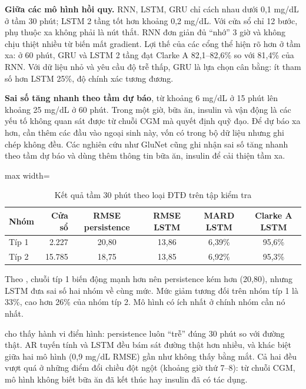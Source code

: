 \textbf{Giữa các mô hình hồi quy.} RNN, LSTM, GRU chỉ cách nhau dưới 0,1 mg/dL ở tầm 30 phút; LSTM 2 tầng tốt hơn khoảng 0,2 mg/dL. Với cửa sổ chỉ 12 bước, phụ thuộc xa không phải là nút thắt. RNN đơn giản đủ ``nhớ'' 3 giờ và không chịu thiệt nhiều từ biến mất gradient. Lợi thế của các cổng thể hiện rõ hơn ở tầm xa: ở 60 phút, GRU và LSTM 2 tầng đạt Clarke A 82,1–82,6\% so với 81,4\% của RNN. Với dữ liệu nhỏ và yêu cầu độ trễ thấp, GRU là lựa chọn cân bằng: ít tham số hơn LSTM 25\%, độ chính xác tương đương.

\textbf{Sai số tăng nhanh theo tầm dự báo}, từ khoảng 6 mg/dL ở 15 phút lên khoảng 25 mg/dL ở 60 phút. Trong một giờ, bữa ăn, insulin và vận động là các yếu tố không quan sát được từ chuỗi CGM mà quyết định quỹ đạo. Để dự báo xa hơn, cần thêm các đầu vào ngoại sinh này, vốn có trong bộ dữ liệu nhưng ghi chép không đều. Các nghiên cứu như GluNet \cite{li2020glunet} cũng ghi nhận sai số tăng nhanh theo tầm dự báo và dùng thêm thông tin bữa ăn, insulin để cải thiện tầm xa.

\begin{table}[H]
\centering
\caption{Kết quả tầm 30 phút theo loại ĐTĐ trên tập kiểm tra}
\label{tab:ch4-type}
\small
\begin{adjustbox}{max width=\linewidth}
\begin{tabular}{@{}lrcccc@{}}
\toprule
\textbf{Nhóm} & \textbf{Cửa sổ} & \textbf{RMSE persistence} & \textbf{RMSE LSTM} & \textbf{MARD LSTM} & \textbf{Clarke A LSTM} \\
\midrule
Típ 1 & 2.227 & 20,80 & 13,86 & 6,39\% & 95,6\% \\
Típ 2 & 15.785 & 18,75 & 13,85 & 6,92\% & 95,3\% \\
\bottomrule
\end{tabular}
\end{adjustbox}
\end{table}

Theo , chuỗi típ 1 biến động mạnh hơn nên persistence kém hơn (20,80), nhưng LSTM đưa sai số hai nhóm về cùng mức. Mức giảm tương đối trên nhóm típ 1 là 33\%, cao hơn 26\% của nhóm típ 2. Mô hình có ích nhất ở chính nhóm cần nó nhất.


 cho thấy hành vi điển hình: persistence luôn ``trễ'' đúng 30 phút so với đường thật. AR tuyến tính và LSTM đều bám sát đường thật hơn nhiều, và khác biệt giữa hai mô hình (0,9 mg/dL RMSE) gần như không thấy bằng mắt. Cả hai đều vượt quá ở những điểm đổi chiều đột ngột (khoảng giờ thứ 7–8): từ chuỗi CGM, mô hình không biết bữa ăn đã kết thúc hay insulin đã có tác dụng.

